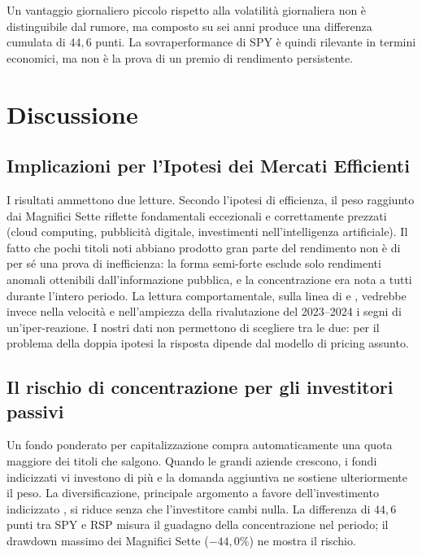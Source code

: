 \documentclass[12pt, a4paper]{article}
\begin{document}
Un vantaggio giornaliero piccolo rispetto alla volatilit\`a giornaliera non \`e distinguibile dal rumore, ma composto su sei anni produce una differenza cumulata di $44{,}6$ punti. La sovraperformance di SPY \`e quindi rilevante in termini economici, ma non \`e la prova di un premio di rendimento persistente.

\section{Discussione}

\subsection{Implicazioni per l'Ipotesi dei Mercati Efficienti}

I risultati ammettono due letture. Secondo l'ipotesi di efficienza, il peso raggiunto dai Magnifici Sette riflette fondamentali eccezionali e correttamente prezzati (cloud computing, pubblicit\`a digitale, investimenti nell'intelligenza artificiale). Il fatto che pochi titoli noti abbiano prodotto gran parte del rendimento non \`e di per s\'e una prova di inefficienza: la forma semi-forte esclude solo rendimenti anomali ottenibili dall'informazione pubblica, e la concentrazione era nota a tutti durante l'intero periodo. La lettura comportamentale, sulla linea di \citet{shiller1981} e \citet{debondt1985}, vedrebbe invece nella velocit\`a e nell'ampiezza della rivalutazione del 2023--2024 i segni di un'iper-reazione. I nostri dati non permettono di scegliere tra le due: per il problema della doppia ipotesi \citep{fama1991} la risposta dipende dal modello di pricing assunto.

\subsection{Il rischio di concentrazione per gli investitori passivi}

Un fondo ponderato per capitalizzazione compra automaticamente una quota maggiore dei titoli che salgono. Quando le grandi aziende crescono, i fondi indicizzati vi investono di pi\`u e la domanda aggiuntiva ne sostiene ulteriormente il peso. La diversificazione, principale argomento a favore dell'investimento indicizzato \citep{markowitz1952}, si riduce senza che l'investitore cambi nulla. La differenza di $44{,}6$ punti tra SPY e RSP misura il guadagno della concentrazione nel periodo; il drawdown massimo dei Magnifici Sette ($-44{,}0\%$) ne mostra il rischio.
\end{document}
